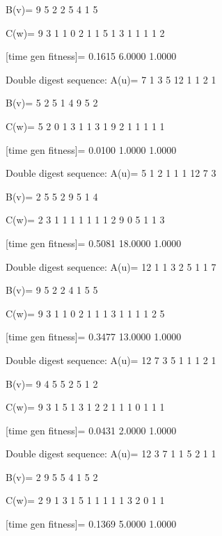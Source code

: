 B(v)=
     9     5     2     2     5     4     1     5

C(w)=
     9     3     1     1     0     2     1     1     5     1     3     1     1     1     1     2

[time gen fitness]=
    0.1615    6.0000    1.0000

Double digest sequence:
A(u)=
     7     1     3     5    12     1     1     2     1

B(v)=
     5     2     5     1     4     9     5     2

C(w)=
     5     2     0     1     3     1     1     3     1     9     2     1     1     1     1     1

[time gen fitness]=
    0.0100    1.0000    1.0000

Double digest sequence:
A(u)=
     5     1     2     1     1     1    12     7     3

B(v)=
     2     5     5     2     9     5     1     4

C(w)=
     2     3     1     1     1     1     1     1     1     2     9     0     5     1     1     3

[time gen fitness]=
    0.5081   18.0000    1.0000

Double digest sequence:
A(u)=
    12     1     1     3     2     5     1     1     7

B(v)=
     9     5     2     2     4     1     5     5

C(w)=
     9     3     1     1     0     2     1     1     1     3     1     1     1     1     2     5

[time gen fitness]=
    0.3477   13.0000    1.0000

Double digest sequence:
A(u)=
    12     7     3     5     1     1     1     2     1

B(v)=
     9     4     5     5     2     5     1     2

C(w)=
     9     3     1     5     1     3     1     2     2     1     1     1     0     1     1     1

[time gen fitness]=
    0.0431    2.0000    1.0000

Double digest sequence:
A(u)=
    12     3     7     1     1     5     2     1     1

B(v)=
     2     9     5     5     4     1     5     2

C(w)=
     2     9     1     3     1     5     1     1     1     1     1     3     2     0     1     1

[time gen fitness]=
    0.1369    5.0000    1.0000

